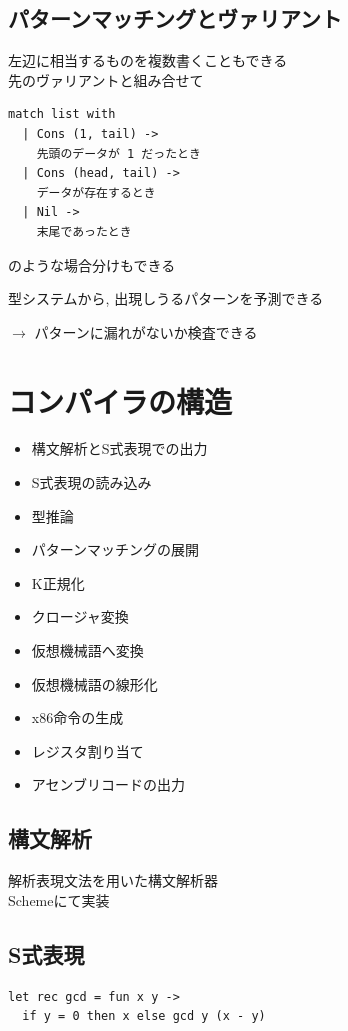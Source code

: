 \documentclass[papersize,30pt,slide]{jsarticle}
\begin{document}
\newpage
\subsection{パターンマッチングとヴァリアント}
左辺に相当するものを複数書くこともできる \\
先のヴァリアントと組み合せて
\begin{lstlisting}
match list with
  | Cons (1, tail) ->
    先頭のデータが 1 だったとき
  | Cons (head, tail) ->
    データが存在するとき
  | Nil ->
    末尾であったとき
\end{lstlisting}
のような場合分けもできる

型システムから, 出現しうるパターンを予測できる 

\hspace{1em} $\rightarrow$ パターンに漏れがないか検査できる

\section{コンパイラの構造}

\begin{itemize}
\item 構文解析とS式表現での出力 
\item S式表現の読み込み
\item 型推論
\item パターンマッチングの展開
\item K正規化
\item クロージャ変換
\item 仮想機械語へ変換
\item 仮想機械語の線形化
\item x86命令の生成
\item レジスタ割り当て
\item アセンブリコードの出力
\end{itemize}

\newpage

\subsection{構文解析}
解析表現文法を用いた構文解析器 \\
Schemeにて実装


\subsection{S式表現}
\begin{lstlisting}
let rec gcd = fun x y ->
  if y = 0 then x else gcd y (x - y)
\end{lstlisting}
\end{document}
